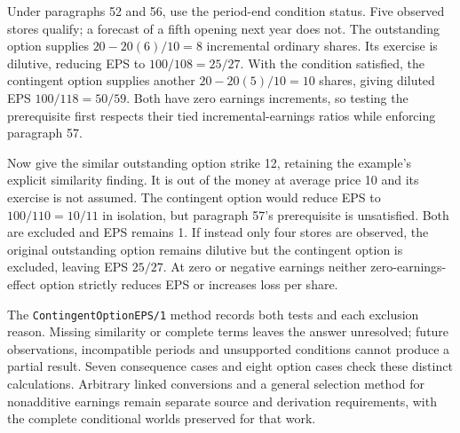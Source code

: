 Under paragraphs 52 and 56, use the period-end condition status. Five observed
stores qualify; a forecast of a fifth opening next year does not. The
outstanding option supplies \(20-20(6)/10=8\) incremental ordinary shares.
Its exercise is dilutive, reducing EPS to \(100/108=25/27\). With the
condition satisfied, the contingent option supplies another
\(20-20(5)/10=10\) shares, giving diluted EPS \(100/118=50/59\).
Both have zero earnings increments, so testing the prerequisite first respects
their tied incremental-earnings ratios while enforcing paragraph 57.

Now give the similar outstanding option strike 12, retaining the example's
explicit similarity finding. It is out of the money at average price 10 and
its exercise is not assumed. The contingent option would reduce EPS to
\(100/110=10/11\) in isolation, but paragraph 57's prerequisite is unsatisfied.
Both are excluded and EPS remains 1. If instead only four stores are observed,
the original outstanding option remains dilutive but the contingent option is
excluded, leaving EPS \(25/27\). At zero or negative earnings neither
zero-earnings-effect option strictly reduces EPS or increases loss per share.

The \texttt{ContingentOptionEPS/1} method records both tests and each exclusion
reason. Missing similarity or complete terms leaves the answer unresolved;
future observations, incompatible periods and unsupported conditions cannot
produce a partial result. Seven consequence cases and eight option cases check
these distinct calculations. Arbitrary linked conversions and a general
selection method for nonadditive earnings remain separate source and derivation
requirements, with the complete conditional worlds preserved for that work.
